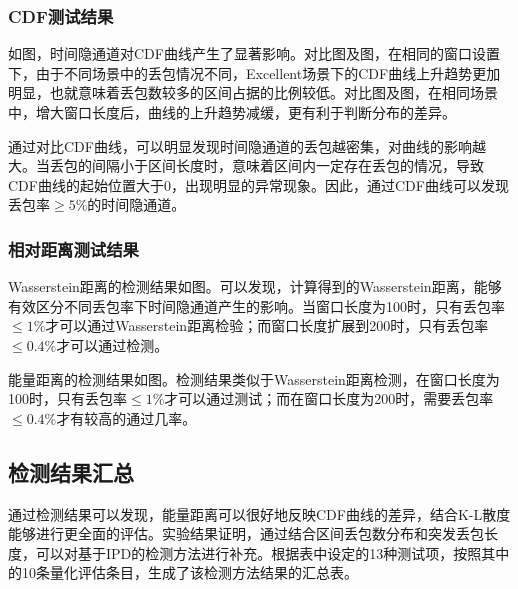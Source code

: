 \subsubsection{CDF测试结果}
\label{chap:analyze:result:window:cdf}

如图，时间隐通道对CDF曲线产生了显著影响。对比图及图，在相同的窗口设置下，由于不同场景中的丢包情况不同，Excellent场景下的CDF曲线上升趋势更加明显，也就意味着丢包数较多的区间占据的比例较低。对比图及图，在相同场景中，增大窗口长度后，曲线的上升趋势减缓，更有利于判断分布的差异。

通过对比CDF曲线，可以明显发现时间隐通道的丢包越密集，对曲线的影响越大。当丢包的间隔小于区间长度时，意味着区间内一定存在丢包的情况，导致CDF曲线的起始位置大于0，出现明显的异常现象。因此，通过CDF曲线可以发现丢包率$\ge5\%$的时间隐通道。

\subsubsection{相对距离测试结果}
\label{chap:analyze:result:window:distance}

Wasserstein距离的检测结果如图。可以发现，计算得到的Wasserstein距离，能够有效区分不同丢包率下时间隐通道产生的影响。当窗口长度为100时，只有丢包率$\le 1\%$才可以通过Wasserstein距离检验；而窗口长度扩展到200时，只有丢包率$\le 0.4\%$才可以通过检测。

能量距离的检测结果如图。检测结果类似于Wasserstein距离检测，在窗口长度为100时，只有丢包率$\le 1\%$才可以通过测试；而在窗口长度为200时，需要丢包率$\le 0.4\%$才有较高的通过几率。

\subsection{检测结果汇总}
通过检测结果可以发现，能量距离可以很好地反映CDF曲线的差异，结合K-L散度能够进行更全面的评估。实验结果证明，通过结合区间丢包数分布和突发丢包长度，可以对基于IPD的检测方法进行补充。根据表中设定的13种测试项，按照其中的10条量化评估条目，生成了该检测方法结果的汇总表。


